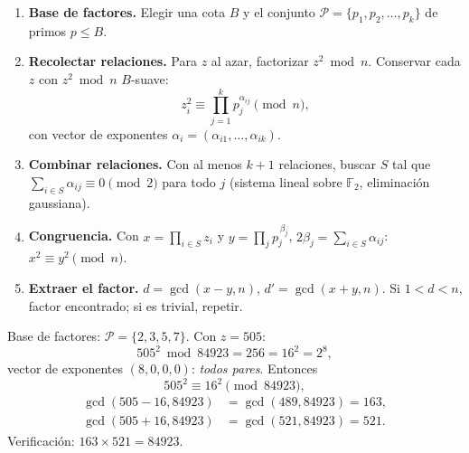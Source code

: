 \begin{enumerate}[label=\textbf{Paso \arabic*.}, leftmargin=2.2cm]
\item \textbf{Base de factores.} Elegir una cota $B$ y el conjunto
$\mathcal{P} = \{p_1, p_2, \dots, p_k\}$ de primos $p \le B$.

\item \textbf{Recolectar relaciones.} Para $z$ al azar, factorizar $z^2 \bmod n$.
Conservar cada $z$ con $z^2 \bmod n$ $B$-suave:
\begin{equation}
z_i^2 \equiv \prod_{j=1}^{k} p_j^{\alpha_{ij}} \pmod{n},
\end{equation}
con vector de exponentes $\alpha_i = (\alpha_{i1}, \dots, \alpha_{ik})$.

\item \textbf{Combinar relaciones.} Con al menos $k+1$ relaciones, buscar $S$
tal que $\sum_{i \in S} \alpha_{ij} \equiv 0 \pmod 2$ para todo $j$
(sistema lineal sobre $\mathbb{F}_2$, eliminación gaussiana).

\item \textbf{Congruencia.} Con $x = \prod_{i \in S} z_i$ y
$y = \prod_{j} p_j^{\,\beta_j}$, $2\beta_j = \sum_{i\in S}\alpha_{ij}$:
$x^2 \equiv y^2 \pmod n$.

\item \textbf{Extraer el factor.}
$d = \gcd(x - y, n)$, $d' = \gcd(x + y, n)$.
Si $1 < d < n$, factor encontrado; si es trivial, repetir.
\end{enumerate}

\begin{ejemplo}[$n = 84923$, $B = 7$]

Base de factores: $\mathcal{P} = \{2, 3, 5, 7\}$. Con $z = 505$:
\begin{equation}
505^2 \bmod 84923 = 256 = 16^2 = 2^8,
\end{equation}
vector de exponentes $(8,0,0,0)$: \emph{todos pares}. Entonces
\begin{equation}
505^2 \equiv 16^2 \pmod{84923},
\end{equation}
\begin{align}
\gcd(505 - 16, 84923) &= \gcd(489, 84923) = 163,\\
\gcd(505 + 16, 84923) &= \gcd(521, 84923) = 521.
\end{align}
Verificación: $163 \times 521 = 84923$.\quad\checkmark
\end{ejemplo}

